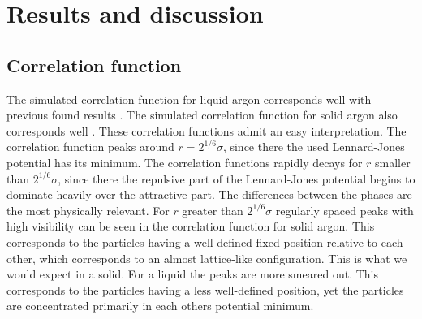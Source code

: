 \section{Results and discussion}


\subsection{Correlation function}

The simulated correlation function for liquid argon corresponds well with previous found results \cite{PhysRev.136.A405}\cite{yoon1981radial}. The simulated correlation function  for solid argon also corresponds well \cite{franchetti1975radial}\cite{jos}. These correlation functions admit an easy interpretation. The correlation function peaks around $r = 2^{1/6} \sigma$, since there the used Lennard-Jones potential has its minimum. The correlation functions rapidly decays for $r$ smaller than $2^{1/6} \sigma$, since there the repulsive part of the Lennard-Jones potential begins to dominate heavily over the attractive part. The differences between the phases are the most physically relevant. For $r$ greater than $2^{1/6}\sigma$ regularly spaced peaks with high visibility can be seen in the correlation function for solid argon. This corresponds to the particles having a well-defined fixed position relative to each other, which corresponds to an almost lattice-like configuration. This is what we would expect in a solid. For a liquid the peaks are more smeared out. This corresponds to the particles having a less well-defined position, yet the particles are concentrated primarily in each others potential minimum.




